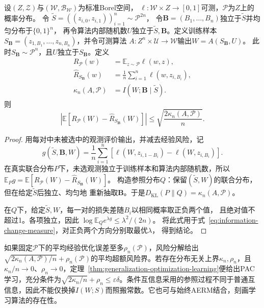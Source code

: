 \begin{theorem}[条件互信息与期望风险]
\label{thm:conditional-information-risk}
设$(Z,\mathcal Z)$与$(\mathcal W,\mathcal B_{\mathcal W})$为标准Borel空间，
$\ell:\mathcal W\times Z\to[0,1]$可测，$\mathcal P$为$Z$上的概率分布。
令
$\tilde S=((z_{i,0},z_{i,1}))_{i=1}^n\sim\mathcal P^{2n}$，
令$\bm B=(B_1,\ldots,B_n)$独立于$\tilde S$并均匀分布于$\{0,1\}^n$，
再令算法内部随机数$U$独立于$\tilde S,\bm B$。定义训练样本
$S_{\bm B}=(z_{1,B_1},\ldots,z_{n,B_n})$，并令可测算法
$A:Z^n\times\mathcal U\to\mathcal W$输出$W=A(S_{\bm B},U)$。
此时$S_{\bm B}\sim\mathcal P^n$，且$U$独立于$S_{\bm B}$。定义
\[
\begin{aligned}
 R_{\mathcal P}(w)
 &=\mathbb E_{z\sim\mathcal P}\ell(w,z),\\
 \hat R_{S_{\bm B}}(w)
 &=\frac1n\sum_{i=1}^n\ell(w,z_{i,B_i}),\\
 \kappa_n(A,\mathcal P)
 &=I(W;\bm B\mid\tilde S).
\end{aligned}
\]
则
\[
 \left|\mathbb E[R_{\mathcal P}(W)-\hat R_{S_{\bm B}}(W)]\right|
 \leq\sqrt{\frac{2\kappa_n(A,\mathcal P)}n}.
\]
\end{theorem}
\begin{proof}
用每对中未被选中的观测评价输出，并减去经验风险，记
\[
 g(\tilde S,\bm B,W)=\frac1n\sum_{i=1}^n
 [\ell(W,z_{i,1-B_i})-\ell(W,z_{i,B_i})].
\]
在真实联合分布$P$下，未选观测独立于训练样本和算法内部随机数，所以
$\mathbb E_Pg=\mathbb E[R_{\mathcal P}(W)-\hat R_{S_{\bm B}}(W)]$。
构造参照分布$Q$：保留$(\tilde S,W)$的联合分布，但在给定$\tilde S$后独立、均匀地
重新抽取$\bm B$。于是$D_{\mathrm{KL}}(P\|Q)=\kappa_n(A,\mathcal P)$。

在$Q$下，给定$\tilde S,W$，每一对的损失差随$B_i$以相同概率取正负两个值，
且绝对值不超过1。各项独立，因此
$\log\mathbb E_Q e^{\lambda g}\leq\lambda^2/(2n)$。
将此式用于式~\eqref{eq:information-change-measure}，对正负两个方向分别取最优$\lambda$，
得到结论。
\end{proof}

如果固定$\mathcal P$下的平均经验优化误差至多$\rho_n(\mathcal P)$，风险分解给出$\sqrt{2\kappa_n(A,\mathcal P)/n}+\rho_n(\mathcal P)$的平均超额风险界。若存在分布无关上界$\kappa_n,\rho_n$，且$\kappa_n/n\to0$、$\rho_n\to0$，定理~\ref{thm:generalization-optimization-learning}便给出PAC学习，充分条件为$\sqrt{2\kappa_n/n}+\rho_n\leq\varepsilon\delta$。条件互信息采用的参照过程不同于普通互信息，因此不能仅换掉$I(W;S)$而照搬常数。它也可与始终AERM结合，刻画学习算法的存在性。

